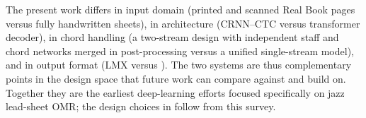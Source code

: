 The present work differs in input domain (printed and scanned Real Book
pages versus fully handwritten sheets), in architecture (CRNN--CTC versus
transformer decoder), in chord handling (a two-stream design with
independent staff and chord networks merged in post-processing versus a
unified single-stream model), and in output format
(LMX versus ).
The two systems are thus complementary points in the design space that
future work can compare against and build on.
Together they are the earliest deep-learning efforts focused
specifically on jazz lead-sheet OMR; the design choices in  follow
from this survey.
